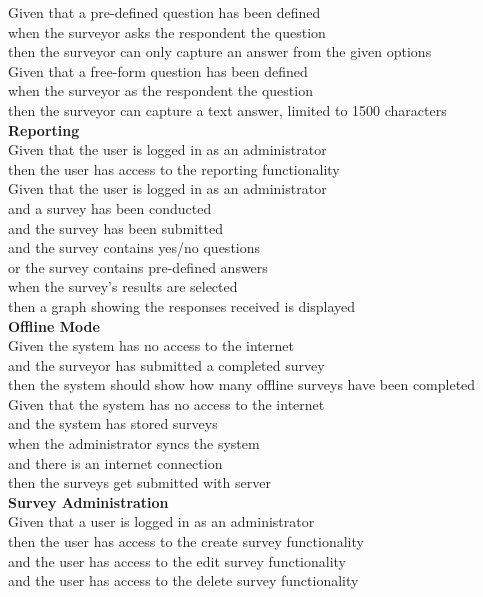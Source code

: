 \documentclass[12pt]{witseiepaper}
\begin{document}
Given that a pre-defined question has been defined\\
when the surveyor asks the respondent the question\\
then the surveyor can only capture an answer from the given options\\

Given that a free-form question has been defined\\
when the surveyor as the respondent the question\\
then the surveyor can capture a text answer, limited to 1500 characters\\

\textbf{Reporting}\\
Given that the user is logged in as an administrator\\
then the user has access to the reporting functionality\\

Given that the user is logged in as an administrator\\
and a survey has been conducted\\
and the survey has been submitted\\
and the survey contains yes/no questions\\
or the survey contains pre-defined answers\\
when the survey’s results are selected\\
then a graph showing the responses received is displayed\\

\textbf{Offline Mode}\\
Given the system has no access to the internet \\
and the surveyor has submitted a completed survey \\
then the system should show how many offline surveys have been completed\\

Given that the system has no access to the internet\\
and the system has stored surveys \\
when the administrator syncs the system\\
and there is an internet connection \\
then the surveys get submitted with server\\

\textbf{Survey Administration}\\
Given that a user is logged in as an administrator\\
then the user has access to the create survey functionality\\
and the user has access to the edit survey functionality\\
and the user has access to the delete survey functionality\\
\end{document}

